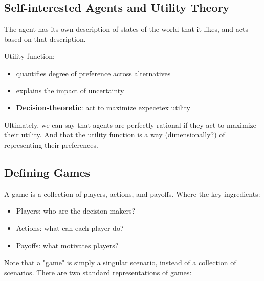 \documentclass{article}
\begin{document}
\subsection{Self-interested Agents and Utility Theory}
\begin{definition}
  The agent has its own description of states of the world that it likes,
  and acts based on that description.

  Utility function:
  \begin{itemize}
    \item quantifies degree of preference across alternatives
    \item explains the impact of uncertainty
    \item \textbf{Decision-theoretic}: act to maximize expecetex utility
  \end{itemize}
\end{definition}
Ultimately, we can say that agents are perfectly rational if they act to maximize their utility.
And that the utility function is a way (dimensionally?) of representing their preferences.

\subsection{Defining Games}
\begin{definition}[Game]
  A game is a collection of players, actions, and payoffs. Where the key ingredients:

  \begin{itemize}
    \item Players: who are the decision-makers?
    \item Actions: what can each player do?
    \item Payoffs: what motivates players?
  \end{itemize}
\end{definition}

Note that a "game" is simply a singular scenario, instead of a collection of scenarios.
There are two standard representations of games:
\end{document}

